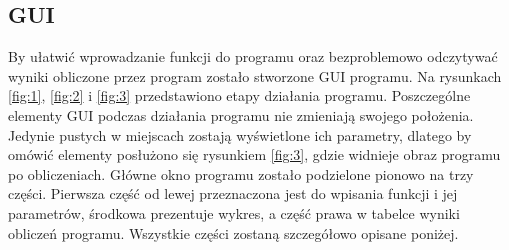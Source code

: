 \documentclass[10pt, a4paper]{article}
\begin{document}
\subsection{GUI}
\label{subsec:gui}
By ułatwić wprowadzanie funkcji do programu oraz bezproblemowo odczytywać wyniki obliczone przez program zostało stworzone GUI programu. Na rysunkach \ref{fig:1}, \ref{fig:2} i \ref{fig:3} przedstawiono etapy działania programu. Poszczególne elementy GUI podczas działania programu nie zmieniają swojego położenia. Jedynie pustych w miejscach zostają wyświetlone ich parametry, dlatego by omówić elementy posłużono się rysunkiem \ref{fig:3}, gdzie widnieje obraz programu po obliczeniach. Główne okno programu zostało podzielone pionowo na trzy części. Pierwsza część od lewej przeznaczona jest do wpisania funkcji i jej parametrów, środkowa prezentuje wykres, a część prawa w tabelce wyniki obliczeń programu. Wszystkie części zostaną szczegółowo opisane poniżej.
\end{document}

